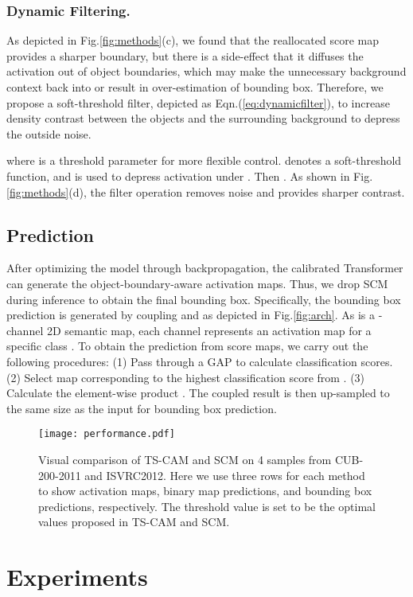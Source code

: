 \documentclass[runningheads]{llncs}
\begin{document}
\subsubsection{Dynamic Filtering.} As depicted in Fig.\ref{fig:methods}(c), we found that the reallocated score map  provides a sharper boundary, but there is a side-effect that it diffuses the activation out of object boundaries, which may make the unnecessary background context back into  or result in over-estimation of bounding box. Therefore, we propose a soft-threshold filter, depicted as Eqn.(\ref{eq:dynamicfilter}), to increase density contrast between the objects and the surrounding background to depress the outside noise.


where  is a threshold parameter for more flexible control.  denotes a soft-threshold function, and  is used to depress activation under . Then . As shown in Fig.\ref{fig:methods}(d), the filter operation removes noise and provides sharper contrast.

\subsection{Prediction}
After optimizing the model through backpropagation, the calibrated Transformer can generate the object-boundary-aware activation maps.
Thus, we drop SCM during inference to obtain the final bounding box. Specifically, the bounding box prediction is generated by coupling  and  as depicted in Fig.\ref{fig:arch}. As  is a -channel 2D semantic map, each channel represents an activation map for a specific class . 
To obtain the prediction from score maps, we carry out the following procedures: (1) Pass  through a GAP to calculate classification scores.
(2) Select  map  corresponding to the highest classification score from .
(3) Calculate the element-wise product . The coupled result is then up-sampled to the same size as the input for bounding box prediction.

\begin{figure}[t]
\centering
\texttt{[image: performance.pdf]}
\caption{Visual comparison of TS-CAM and SCM on 4 samples from CUB-200-2011 and ISVRC2012.
Here we use three rows for each method to show activation maps, binary map predictions, and bounding box predictions, respectively. The threshold value  is set to be the optimal values proposed in TS-CAM and SCM.}
\label{fig:performance}
\end{figure}

\section{Experiments}
\label{sec:experiments}
\end{document}

